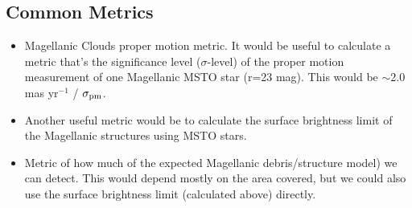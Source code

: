 \begin{enumerate}


\end{enumerate}


\subsection{Common Metrics}
\label{sec:\chpname:metrics}



\begin{itemize}

\item  Magellanic Clouds proper motion metric.
It would be useful to calculate a metric that's the significance level ($\sigma$-level) of the proper motion measurement of one Magellanic MSTO star (r=23 mag).
This would be $\sim$2.0 mas yr$^{-1}$ / $\sigma_{\rm pm}$.

\item Another useful metric would be to calculate the surface
brightness limit of the Magellanic structures using MSTO stars.

\item Metric of how much of the expected Magellanic debris/structure
\citet[from][]{2012MNRAS.421.2109B} model) we can detect.  This would depend
mostly on the area covered, but we could also use the surface
brightness limit (calculated above) directly.

\end{itemize}





\navigationbar
